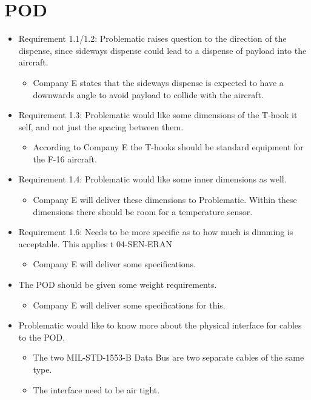 \section*{POD}
\begin{itemize}
    \item Requirement 1.1/1.2: Problematic raises question to the direction of the dispense, since sideways dispense could lead to a dispense of payload into the aircraft.\\
    \begin{itemize}
        \item Company E states that the sideways dispense is expected to have a downwards angle to avoid payload to collide with the aircraft.
    \end{itemize}
    \item Requirement 1.3: Problematic would like some dimensions of the T-hook it self, and not just the spacing between them.
    \begin{itemize}
        \item According to Company E the T-hooks should be standard equipment for the F-16 aircraft.
    \end{itemize}
    \item Requirement 1.4: Problematic would like some inner dimensions as well.
    \begin{itemize}
        \item Company E will deliver these dimensions to Problematic. Within these dimensions there should be room for a temperature sensor.
    \end{itemize}
    \item Requirement 1.6: Needs to be more specific as to how much is dimming is acceptable. This applies t 04-SEN-ERAN
    \begin{itemize}
        \item Company E will deliver some specifications.
    \end{itemize}
    \item The POD should be given some weight requirements.
    \begin{itemize}
        \item Company E will deliver some specifications for this.
    \end{itemize}
    \item Problematic would like to know more about the physical interface for cables to the POD.
    \begin{itemize}
        \item The two MIL-STD-1553-B Data Bus are two separate cables of the same type.
        \item The interface need to be air tight.
    \end{itemize}
\end{itemize}


